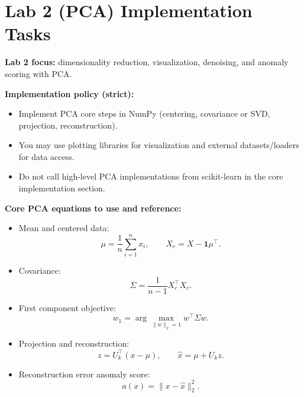 \section*{Lab 2 (PCA) Implementation Tasks}
\textbf{Lab 2 focus:} dimensionality reduction, visualization, denoising, and anomaly scoring with PCA.

\medskip
\textbf{Implementation policy (strict):}
\begin{itemize}
  \item Implement PCA core steps in NumPy (centering, covariance or SVD, projection, reconstruction).
  \item You may use plotting libraries for visualization and external datasets/loaders for data access.
  \item Do not call high-level PCA implementations from scikit-learn in the core implementation section.
\end{itemize}

\medskip
\textbf{Core PCA equations to use and reference:}
\begin{itemize}
  \item Mean and centered data:
  \[
    \mu = \frac{1}{n}\sum_{i=1}^{n}x_i,\qquad X_c = X-\mathbf{1}\mu^\top.
  \]
  \item Covariance:
  \[
    \Sigma=\frac{1}{n-1}X_c^\top X_c.
  \]
  \item First component objective:
  \[
    w_1=\arg\max_{\|w\|_2=1} w^\top \Sigma w.
  \]
  \item Projection and reconstruction:
  \[
    z = U_k^\top(x-\mu),\qquad \hat{x}=\mu+U_k z.
  \]
  \item Reconstruction error anomaly score:
  \[
    a(x)=\|x-\hat{x}\|_2^2.
  \]
\end{itemize}

